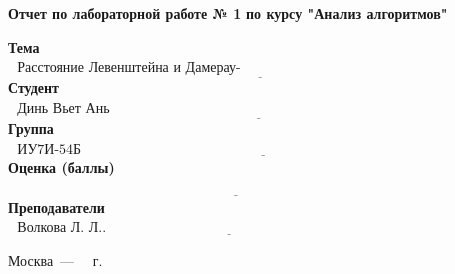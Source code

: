 \begin{titlepage}
	\begin{center}
		\Large\textbf{Отчет по лабораторной работе № 1}
		\Large\textbf{по курсу "Анализ алгоритмов"}
	\end{center}

	\noindent\textbf{Тема} $\underline{\text{~~Расстояние Левенштейна и Дамерау-Левенштейна~~~~~~~~~~~~~~~~~~~~~~~~~~~~~~~~~~~~~~~~~~~}}$\newline\newline
	\noindent\textbf{Студент} $\underline{\text{~~Динь Вьет Ань~~~~~~~~~~~~~~~~~~~~~~~~~~~~~~~~~~~~~~~~~~~~~~~~~~~~~~~~~~~~~~~~~~~~~~~~~~~~~~~~~~~~~~}}$\newline\newline
	\noindent\textbf{Группа} $\underline{\text{~~ИУ7И-54Б~~~~~~~~~~~~~~~~~~~~~~~~~~~~~~~~~~~~~~~~~~~~~~~~~~~~~~~~~~~~~~~~~~~~~~~~~~~~~~~~~~~~~~~~~~~~~~}}$\newline\newline
	\noindent\textbf{Оценка (баллы)} $\underline{\text{~~~~~~~~~~~~~~~~~~~~~~~~~~~~~~~~~~~~~~~~~~~~~~~~~~~~~~~~~~~~~~~~~~~~~~~~~~~~~~~~~~~~~~~~~~~~~~~~~~}}$\newline\newline
	\noindent\textbf{Преподаватели} $\underline{\text{~~Волкова Л. Л..~~~~~~~~~~~~~~~~~~~~~~~~~~~~~~~~~~~~~~~~~~~~~~~~~~~~~~~~~~~~~~~~~~~~~~~~~~}}$\newline

	\begin{center}
		\vfill
		Москва~---~\the\year
		~г.
	\end{center}
	\restoregeometry
\end{titlepage}

